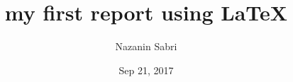 \documentclass{article}
\begin{document}
\title{my first report using LaTeX}
\author{Nazanin Sabri}
\date{Sep 21, 2017}
\maketitle
\end{document}
